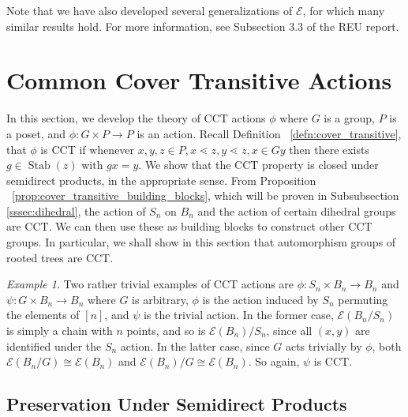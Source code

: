\documentclass[smallextended, envcountsame, numbook]{svjour3}
\theoremstyle{plain}
\theoremstyle{definition}
\theoremstyle{remark}
\newtheorem{eg}[thm]{Example}
\numberwithin{equation}{section}
\newcommand\ssec{\subsection}
\newcommand\Stab{\operatorname{Stab}}
\begin{document}
Note that we have also developed several generalizations of $\mathcal E$, for which many similar results hold. For more information, see Subsection 3.3 of the REU report.


\section{Common Cover Transitive Actions}
\label{sec:cover_transitive}
In this section, we develop the theory of CCT actions $\phi$ where $G$ is a group, $P$ is a poset, and $\phi:G\times P \rightarrow P$ is an action. Recall Definition ~\ref{defn:cover_transitive}, that $\phi$ is CCT if whenever $x,y,z \in P,x\lessdot z,y\lessdot z,x \in Gy$ then there exists $g \in \Stab(z)$ with $gx = y$.  We show that the CCT property is closed under semidirect products, in the appropriate sense. From Proposition ~\ref{prop:cover_transitive_building_blocks}, which will be proven in Subsubsection \ref{sssec:dihedral}, the action of $S_n$ on $B_n$ and the action of certain dihedral groups are CCT. We can then use these as building blocks to construct other CCT groups. In particular, we shall show in this section that automorphism groups of rooted trees are CCT.

\begin{eg}
\label{eg:trivial_edgequot}
Two rather trivial examples of CCT actions are $\phi\colon S_n\times B_n \rightarrow B_n$ and $\psi\colon G\times B_n\rightarrow B_n$ where $G$ is arbitrary, $\phi$ is the action induced by $S_n$ permuting the elements of $[n]$, and $\psi$ is the trivial action. In the former case, $\mathcal E(B_n/S_n)$ is simply a chain with $n$ points, and so is $\mathcal E(B_n)/S_n$, since all $(x, y)$ are identified under the $S_n$ action. In the latter case, since $G$ acts trivially by $\phi$, both  $\mathcal E(B_n/G) \cong \mathcal E(B_n)$ and $\mathcal E(B_n)/G \cong \mathcal E(B_n)$. So again, $\psi$ is CCT.
\end{eg}

\ssec{Preservation Under Semidirect Products}
\label{ssec:semidirect_product_preservation}
\end{document}
